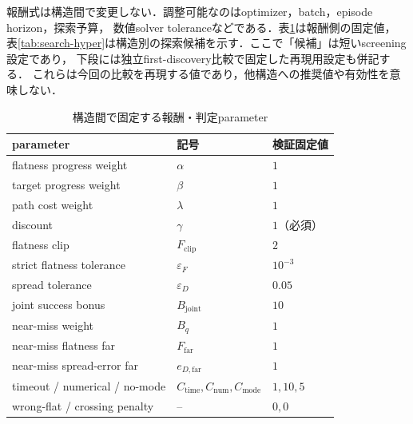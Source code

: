 \documentclass[a4paper,11pt]{ltjsarticle}
\begin{document}
報酬式は構造間で変更しない．調整可能なのはoptimizer，batch，episode horizon，探索予算，
数値solver toleranceなどである．表\ref{tab:reward-hyper}は報酬側の固定値，
表\ref{tab:search-hyper}は構造別の探索候補を示す．ここで「候補」は短いscreening設定であり，
下段には独立first-discovery比較で固定した再現用設定も併記する．
これらは今回の比較を再現する値であり，他構造への推奨値や有効性を意味しない．

\begin{table}[htbp]
\centering
\caption{構造間で固定する報酬・判定parameter}
\label{tab:reward-hyper}
\begin{tabular}{lll}
\toprule
parameter & 記号 & 検証固定値 \\
\midrule
flatness progress weight & $\alpha$ & $1$ \\
target progress weight & $\beta$ & $1$ \\
path cost weight & $\lambda$ & $1$ \\
discount & $\gamma$ & $1$（必須） \\
flatness clip & $F_{\mathrm{clip}}$ & $2$ \\
strict flatness tolerance & $\varepsilon_F$ & $10^{-3}$ \\
spread tolerance & $\varepsilon_D$ & $0.05$ \\
joint success bonus & $B_{\mathrm{joint}}$ & $10$ \\
near-miss weight & $B_q$ & $1$ \\
near-miss flatness far & $F_{\mathrm{far}}$ & $1$ \\
near-miss spread-error far & $e_{D,\mathrm{far}}$ & $1$ \\
timeout / numerical / no-mode & $C_{\mathrm{time}},C_{\mathrm{num}},C_{\mathrm{mode}}$ & $1,10,5$ \\
wrong-flat / crossing penalty & -- & $0,0$ \\
\bottomrule
\end{tabular}
\end{table}
\end{document}
